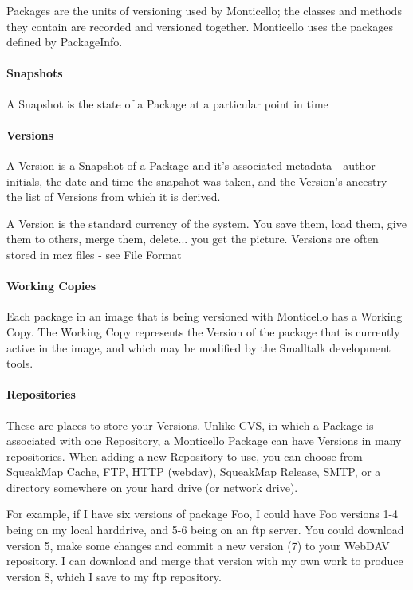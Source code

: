 \documentclass[a4paper,10pt,twoside]{book}
\begin{document}
Packages are the units of versioning used by Monticello; the classes and methods they contain are recorded and versioned together. Monticello uses the packages defined by PackageInfo.

\paragraph{Snapshots}

A Snapshot is the state of a Package at a particular point in time

\paragraph{Versions}

A Version is a Snapshot of a Package and it's associated metadata - author initials, the date and time the snapshot was taken, and the Version's ancestry - the list of Versions from which it is derived.

A Version is the standard currency of the system. You save them, load them, give them to others, merge them, delete... you get the picture. Versions are often stored in mcz files - see File Format

\paragraph{Working Copies}

Each package in an image that is being versioned with Monticello has a Working Copy. The Working Copy represents the Version of the package that is currently active in the image, and which may be modified by the Smalltalk development tools.

\paragraph{Repositories}

These are places to store your Versions. Unlike CVS, in which a Package is associated with one Repository, a Monticello Package can have Versions in many repositories. When adding a new Repository to use, you can choose from SqueakMap Cache, FTP, HTTP (webdav), SqueakMap Release, SMTP, or a directory somewhere on your hard drive (or network drive).

For example, if I have six versions of package Foo, I could have Foo versions 1-4 being on my local harddrive, and 5-6 being on an ftp server. You could download version 5, make some changes and commit a new version (7) to your WebDAV repository. I can download and merge that version with my own work to produce version 8, which I save to my ftp repository.
\end{document}
